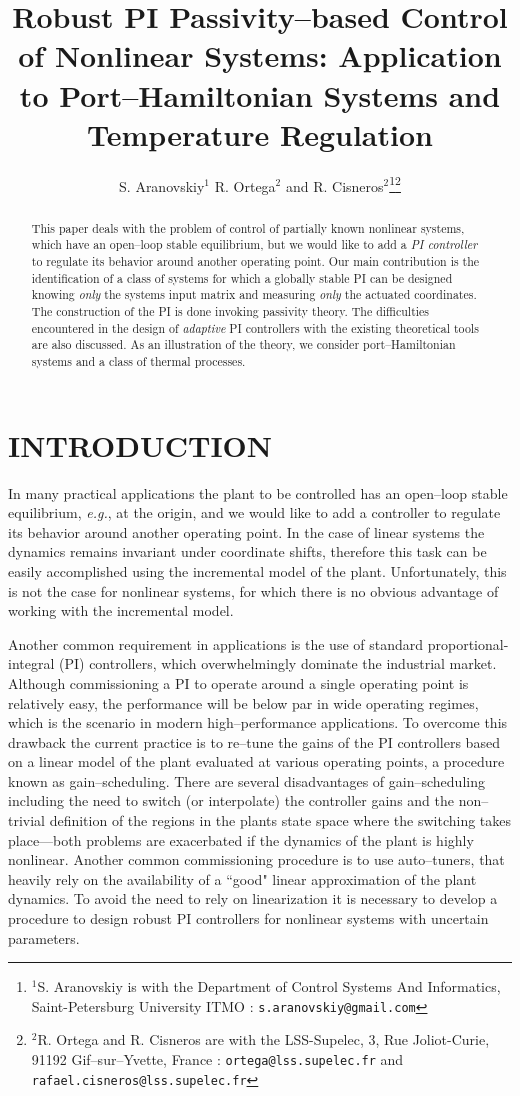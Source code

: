 \documentclass[10pt, conference]{ieeeconf}
\title{\LARGE \bf {Robust PI Passivity--based Control of Nonlinear Systems: Application to Port--Hamiltonian Systems and Temperature Regulation}}\date{}
\author{S. Aranovskiy$^{1}$ R. Ortega$^{2}$ and R. Cisneros$^{2}$\thanks{$^{1}$S. Aranovskiy is with the Department of Control Systems And Informatics, Saint-Petersburg University ITMO :  {\tt\small s.aranovskiy@gmail.com}}\thanks{$^{2}$R. Ortega and R. Cisneros are with the LSS-Supelec, 3, Rue Joliot-Curie, 91192 Gif--sur--Yvette, France : {\tt\small ortega@lss.supelec.fr} and {\tt\small rafael.cisneros@lss.supelec.fr} }}
\def\lab{\label}
\begin{document}
\maketitle
\thispagestyle{empty}
\pagestyle{empty}
	
\begin{abstract}
This paper deals with the problem of control of partially known nonlinear systems, which have an open--loop stable equilibrium, but we would like to add a {\em PI controller} to regulate its behavior around another operating point. Our main contribution is the identification of a class of systems for which  a globally stable PI can be designed knowing  {\em only} the systems input matrix and measuring {\em only} the actuated coordinates. The construction of the PI is done invoking passivity theory. The difficulties encountered in the design of {\em adaptive} PI controllers with the existing theoretical tools are also discussed. As an illustration of the theory, we consider port--Hamiltonian systems and a class of thermal processes.
\end{abstract}




\section{INTRODUCTION}
\lab{sec1}	
In many practical applications the plant to be controlled has an open--loop stable equilibrium, {\em e.g.}, at the origin, and we would like to add a controller to regulate its behavior around another operating point. In the case of linear systems the dynamics remains invariant under coordinate shifts, therefore this task can be easily accomplished using the incremental model of the plant. Unfortunately, this is not the case for nonlinear systems, for which there is no obvious advantage of working with the incremental model.

Another common requirement in applications is the use of standard proportional-integral (PI) controllers, which overwhelmingly dominate the industrial market. Although commissioning a PI to operate around a single operating point is relatively easy, the performance will be below par in wide operating regimes, which is the scenario in modern high--performance applications. To overcome this drawback the current practice is to re--tune the gains of the PI controllers based on a linear model of the plant evaluated at various operating points, a procedure known as gain--scheduling. There are several  disadvantages of gain--scheduling including the need to switch (or interpolate) the controller gains  and the non--trivial definition of the regions in the plants state space where the switching takes place---both problems are exacerbated if the dynamics of the plant is highly nonlinear. Another common commissioning procedure is to use auto--tuners,  that heavily rely on the availability of a ``good" linear approximation of the plant dynamics. To avoid the need to rely on linearization it is necessary to develop a procedure to design robust PI controllers for nonlinear systems with uncertain parameters.
\end{document}
